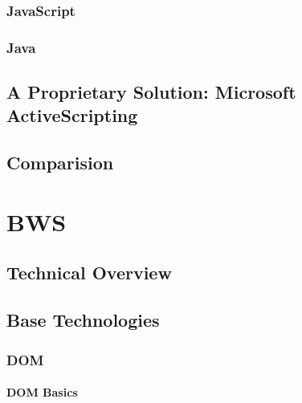   \subsection{JavaScript}
   
   
    
  \subsection{Java}
  
   
    
  \section{A Proprietary Solution: Microsoft ActiveScripting}
  \label{sec:activescripting}
    
   
     
  \section{Comparision}
   
  
\chapter{BWS}

 

 \section{Technical Overview}
  
  
  
 \section{Base Technologies}
 \label{sec:BaseTechnologies}
  
  
  
  \subsection{DOM}
  
   
   
   \subsubsection{DOM Basics}
   
